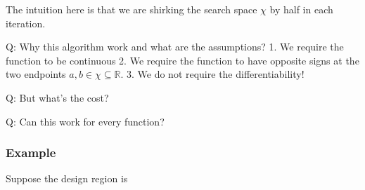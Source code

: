 \documentclass[
  letterpaper,
  DIV=11,
  numbers=noendperiod]{scrreprt}
\begin{document}
The intuition here is that we are shirking the search space \(\chi\) by
half in each iteration.

Q: Why this algorithm work and what are the assumptions? 1. We require
the function to be continuous 2. We require the function to have
opposite signs at the two endpoints \(a,b\in\chi\subseteq \mathbb R\).
3. We do not require the differentiability!

Q: But what's the cost?

Q: Can this work for every function?

\subsubsection{Example}\label{example}

Suppose the design region is
\end{document}
